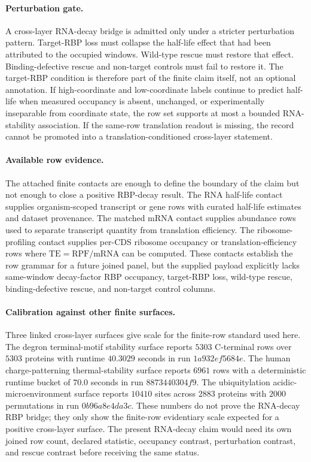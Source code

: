 \paragraph{Perturbation gate.}
A cross-layer RNA-decay bridge is admitted only under a stricter perturbation pattern. Target-RBP loss must collapse the half-life effect that had been attributed to the occupied windows. Wild-type rescue must restore that effect. Binding-defective rescue and non-target controls must fail to restore it. The target-RBP condition is therefore part of the finite claim itself, not an optional annotation. If high-coordinate and low-coordinate labels continue to predict half-life when measured occupancy is absent, unchanged, or experimentally inseparable from coordinate state, the row set supports at most a bounded RNA-stability association. If the same-row translation readout is missing, the record cannot be promoted into a translation-conditioned cross-layer statement.

\paragraph{Available row evidence.}
The attached finite contacts are enough to define the boundary of the claim but not enough to close a positive RBP-decay result. The RNA half-life contact supplies organism-scoped transcript or gene rows with curated half-life estimates and dataset provenance. The matched mRNA contact supplies abundance rows used to separate transcript quantity from translation efficiency. The ribosome-profiling contact supplies per-CDS ribosome occupancy or translation-efficiency rows where $\mathrm{TE}=\mathrm{RPF}/\mathrm{mRNA}$ can be computed. These contacts establish the row grammar for a future joined panel, but the supplied payload explicitly lacks same-window decay-factor RBP occupancy, target-RBP loss, wild-type rescue, binding-defective rescue, and non-target control columns.

\paragraph{Calibration against other finite surfaces.}
Three linked cross-layer surfaces give scale for the finite-row standard used here. The degron terminal-motif stability surface reports $5303$ C-terminal rows over $5303$ proteins with runtime $40.3029$ seconds in run $1a932ef5684e$. The human charge-patterning thermal-stability surface reports $6961$ rows with a deterministic runtime bucket of $70.0$ seconds in run $8873440304f9$. The ubiquitylation acidic-microenvironment surface reports $10410$ sites across $2883$ proteins with $2000$ permutations in run $0b96a8e4da3c$. These numbers do not prove the RNA-decay RBP bridge; they only show the finite-row evidentiary scale expected for a positive cross-layer surface. The present RNA-decay claim would need its own joined row count, declared statistic, occupancy contrast, perturbation contrast, and rescue contrast before receiving the same status.

